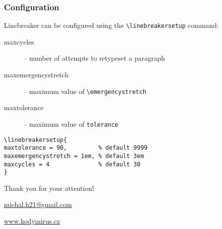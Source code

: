 \begin{frame}[fragile]
  \frametitle{Configuration}
  Linebreaker can be configured using the \verb|\linebreakersetup| command:
  \begin{description}
    \item[maxcycles] -- number of attempts to retypeset a paragraph
    \item[maxemergencystretch] -- maximum value of \verb|\emergencystretch|
    \item[maxtolerance]  -- maximum value of \verb|tolerance|
  \end{description}
\begin{verbatim}
\linebreakersetup{
maxtolerance = 90,         % default 9999
maxemergencystretch = 1em, % default 3em
maxcycles = 4              % default 30
}
\end{verbatim}

\end{frame}


\begin{frame}[standout]
  Thank you for your attention!

  \url{michal.h21@gmail.com}

  \url{www.kodymirus.cz}
\end{frame}



